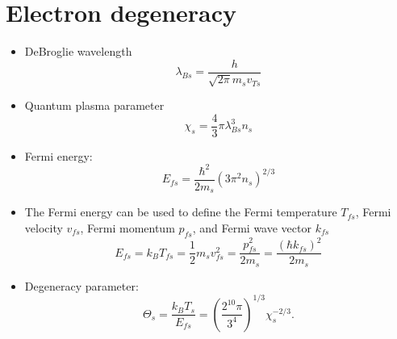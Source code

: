 \documentclass[a4paper,11pt]{report}
\begin{document}
\section{Electron degeneracy}

\begin{itemize}
    \item DeBroglie wavelength
    \begin{equation}
        \lambda_{Bs} = \dfrac{h}{\sqrt{2 \pi} m_s v_{Ts}}
    \end{equation}
    \item Quantum plasma parameter
    \begin{equation}
        \chi_s = \frac{4}{3} \pi \lambda_{Bs}^3 n_s
    \end{equation}
    
    \item Fermi energy:
    \begin{equation}
        E_{fs} = \frac{\hbar^2}{2m_s} \left( 3 \pi^2 n_s \right)^{2/3}
    \end{equation}

    \item The Fermi energy can be used to define the Fermi temperature $T_{fs}$, Fermi velocity $v_{fs}$, Fermi momentum $p_{fs}$, and Fermi wave vector $k_{fs}$
    \begin{equation}
        E_{fs} = k_B T_{fs} = \frac{1}{2} m_s v_{fs}^2  = \frac{p_{fs}^2}{2m_s} = \frac{\left ( \hbar k_{fs} \right ) ^2}{2m_s}
    \end{equation}

    \item Degeneracy parameter:
    \begin{equation}
        \Theta_s = \frac{k_B T_s}{E_{fs}} = \left( \frac{2^{10} \pi}{3^4} \right)^{1/3} \chi_s^{-2/3}.
    \end{equation}
\end{itemize}

\end{document}

